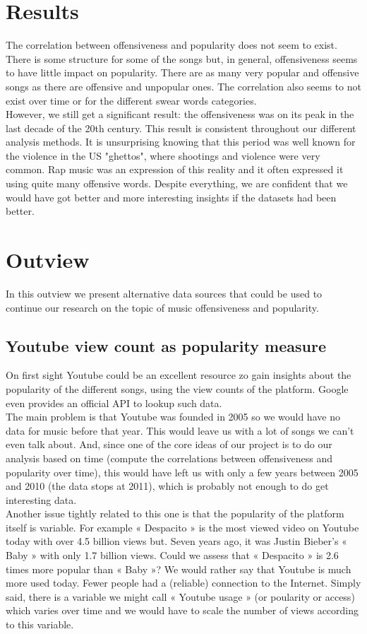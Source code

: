 \documentclass[11pt]{article}
\begin{document}
\section{Results}
The correlation between offensiveness and popularity does not seem to exist. There is some structure for some of the songs but, in general, offensiveness seems to have little impact on popularity. There are as many very popular and offensive songs as there are offensive and unpopular ones. The correlation also seems to not exist over time or for the different swear words categories.\\
However, we still get a significant result: the offensiveness was on its peak in the last decade of the 20th century. This result is consistent throughout our different analysis methods. It is unsurprising knowing that this period was well known for the violence in the US "ghettos", where shootings and violence were very common. Rap music was an expression of this reality and it often expressed it using quite many offensive words. Despite everything, we are confident that we would have got better and more interesting insights if the datasets had been better.

\section{Outview}
In this outview we present alternative data sources that could be used to continue our research on the topic of music offensiveness and popularity.

\subsection{Youtube view count as popularity measure}
On first sight Youtube could be an excellent resource zo gain insights about the popularity of the different songs, using the view counts of the platform. Google even provides an official API to lookup such data.\\
The main problem is that Youtube was founded in 2005 so we would have no data for music before that
year. This would leave us with a lot of songs we can’t even talk about. And, since one of the core ideas of
our project is to do our analysis based on time (compute the correlations between offensiveness and
popularity over time), this would have left us with only a few years between 2005 and 2010 (the data
stops at 2011), which is probably not enough to do get interesting data.\\
Another issue tightly related to this one is that the popularity of the platform itself is variable. For example « Despacito » is the most viewed video on Youtube today with over 4.5 billion views but. Seven years ago, it was Justin Bieber’s « Baby » with only 1.7 billion views. Could we assess that « Despacito » is 2.6 times more popular than « Baby »? We would rather say that Youtube is much more used today. Fewer people had a (reliable) connection to the Internet. Simply said, there is a variable we might call « Youtube usage » (or poularity
or access) which varies over time and we would have to scale the number of views according to this variable.
\end{document}
